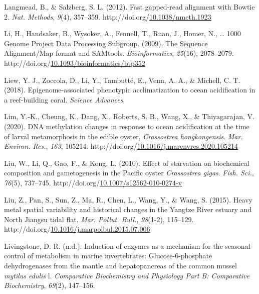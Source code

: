 \documentclass [11pt, proquest] {uwthesis}[2015/03/03]
\newlength{\cslhangindent}
\newenvironment{CSLReferences}%
{\setlength{\parindent}{0pt}%
\everypar{\setlength{\hangindent}{\cslhangindent}}\ignorespaces}%
{\par}
\begin{document}
\begin{CSLReferences}{1}{0}
\leavevmode\hypertarget{ref-Langmead2012}{}%
Langmead, B., \& Salzberg, S. L. (2012). {Fast gapped-read alignment with Bowtie 2}. \emph{Nat. Methods}, \emph{9}(4), 357--359. http://doi.org/\href{https://doi.org/10.1038/nmeth.1923}{10.1038/nmeth.1923}

\leavevmode\hypertarget{ref-Li2009}{}%
Li, H., Handsaker, B., Wysoker, A., Fennell, T., Ruan, J., Homer, N., \ldots{} 1000 Genome Project Data Processing Subgroup. (2009). {The Sequence Alignment/Map format and SAMtools}. \emph{Bioinformatics}, \emph{25}(16), 2078--2079. http://doi.org/\href{https://doi.org/10.1093/bioinformatics/btp352}{10.1093/bioinformatics/btp352}

\leavevmode\hypertarget{ref-Liew2018}{}%
Liew, Y. J., Zoccola, D., Li, Y., Tambutté, E., Venn, A. A., \& Michell, C. T. (2018). {Epigenome-associated phenotypic acclimatization to ocean acidification in a reef-building coral}. \emph{Science Advances}.

\leavevmode\hypertarget{ref-Lim2020}{}%
Lim, Y.-K., Cheung, K., Dang, X., Roberts, S. B., Wang, X., \& Thiyagarajan, V. (2020). {DNA methylation changes in response to ocean acidification at the time of larval metamorphosis in the edible oyster, \emph{Crassostrea hongkongensis}}. \emph{Mar. Environ. Res.}, \emph{163}, 105214. http://doi.org/\href{https://doi.org/10.1016/j.marenvres.2020.105214}{10.1016/j.marenvres.2020.105214}

\leavevmode\hypertarget{ref-Liu2010}{}%
Liu, W., Li, Q., Gao, F., \& Kong, L. (2010). {Effect of starvation on biochemical composition and gametogenesis in the Pacific oyster \emph{Crassostrea gigas}}. \emph{Fish. Sci.}, \emph{76}(5), 737--745. http://doi.org/\href{https://doi.org/10.1007/s12562-010-0274-y}{10.1007/s12562-010-0274-y}

\leavevmode\hypertarget{ref-Liu2015}{}%
Liu, Z., Pan, S., Sun, Z., Ma, R., Chen, L., Wang, Y., \& Wang, S. (2015). {Heavy metal spatial variability and historical changes in the Yangtze River estuary and North Jiangsu tidal flat}. \emph{Mar. Pollut. Bull.}, \emph{98}(1-2), 115--129. http://doi.org/\href{https://doi.org/10.1016/j.marpolbul.2015.07.006}{10.1016/j.marpolbul.2015.07.006}

\leavevmode\hypertarget{ref-Livingstone1981}{}%
Livingstone, D. R. (n.d.). Induction of enzymes as a mechanism for the seasonal control of metabolism in marine invertebrates: Glucose-6-phosphate dehydrogenases from the mantle and hepatopancreas of the common mussel \emph{mytilus edulis} l. \emph{Comparative Biochemistry and Physiology Part B: Comparative Biochemistry}, \emph{69}(2), 147--156.


\end{CSLReferences}
\end{document}
